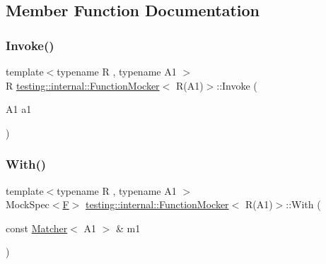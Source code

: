 \subsection{Member Function Documentation}
\mbox{\label{classtesting_1_1internal_1_1_function_mocker_3_01_r_07_a1_08_4_a4a58d37902572c8136d999c5008dce1a}} 
\subsubsection{\texorpdfstring{Invoke()}{Invoke()}}
{\footnotesize\ttfamily template$<$typename R , typename A1 $>$ \\
R \mbox{\hyperlink{classtesting_1_1internal_1_1_function_mocker}{testing\+::internal\+::\+Function\+Mocker}}$<$ R(A1)$>$\+::Invoke (\begin{DoxyParamCaption}\item[{A1}]{a1 }\end{DoxyParamCaption})\hspace{0.3cm}{\ttfamily [inline]}}

\mbox{\label{classtesting_1_1internal_1_1_function_mocker_3_01_r_07_a1_08_4_acad7b9da099d38f5e37b63c430374cc8}} 
\subsubsection{\texorpdfstring{With()}{With()}}
{\footnotesize\ttfamily template$<$typename R , typename A1 $>$ \\
Mock\+Spec$<$\mbox{\hyperlink{classtesting_1_1internal_1_1_function_mocker_3_01_r_07_a1_08_4_ada54286442ab14a18c2308cef748848f}{F}}$>$ \mbox{\hyperlink{classtesting_1_1internal_1_1_function_mocker}{testing\+::internal\+::\+Function\+Mocker}}$<$ R(A1)$>$\+::With (\begin{DoxyParamCaption}\item[{const \mbox{\hyperlink{classtesting_1_1_matcher}{Matcher}}$<$ A1 $>$ \&}]{m1 }\end{DoxyParamCaption})\hspace{0.3cm}{\ttfamily [inline]}}



